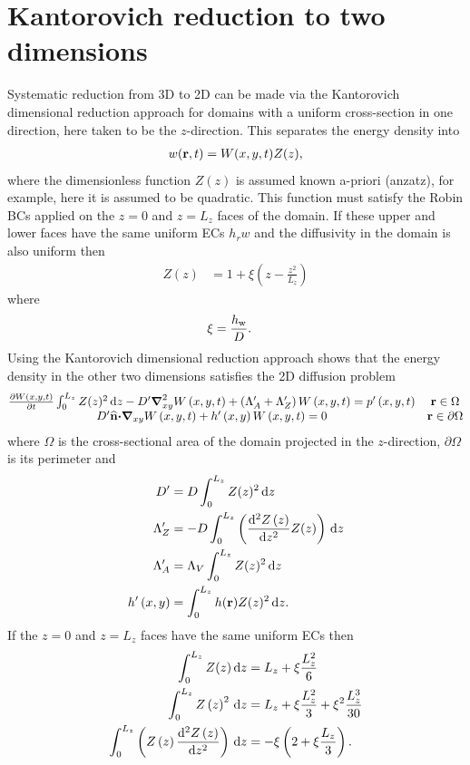 \documentclass[a4paper]{article}
\numberwithin{equation}{section}
\begin{document}
\section[Kantorovich reduction to two dimensions]{Kantorovich reduction to two dimensions}
\label{sc:Kant}

Systematic reduction from 3D to 2D can be made via the Kantorovich dimensional
reduction approach for domains with a uniform cross-section in one direction,
here taken to be the $z$-direction. This separates the energy density into
\begin{align}
w(\boldsymbol{\mathrm{r}},t) = W(x,y,t)Z(z),
\end{align}
where the dimensionless function $Z(z)$ is assumed known a-priori
(anzatz), for example, here it is assumed to be quadratic. This function must
satisfy the Robin BCs applied on the  $z=0$ and  $z=L_z$ faces of the domain.
If these upper and lower faces have the same uniform ECs $h_rw$ and the
diffusivity in the domain is also uniform then
\begin{align}
Z(z) &= 1 + \xi\left( z-\frac{z^2}{L_z} \right)
\end{align}
where
\begin{align}
\xi &= \frac{h_{\mathrm{w}}} D.
\end{align}
Using the Kantorovich dimensional reduction approach shows that the energy
density in the other two dimensions satisfies the 2D diffusion problem
\begin{align}
\begin{matrix}
\frac{{\partial}W\left(x,y,t\right)}{{\partial}t}
\int_0^{L_z}Z(z)^2\,\mathrm{d}{z}
- D^\prime{\boldsymbol{\mathrm{\nabla}}}_{xy}^2W\left(x,y,t\right)
+ \left(\Lambda_A^\prime+\Lambda _Z^\prime\right)W\left(x,y,t\right)
= p^\prime\left(x,y,t\right)
& \boldsymbol{\mathrm{r}}\in\Omega\\
D^\prime\widehat{\boldsymbol{\mathrm{n}}}{\boldsymbol{\mathrm{\cdot}}}{\boldsymbol{\mathrm{\nabla}}}_{xy}W\left(x,y,t\right)+h^\prime\left(x,y\right)W\left(x,y,t\right)=0
&\boldsymbol{\mathrm{r}}\in\partial\Omega
\end{matrix}
\end{align}
where $\Omega$ is the cross-sectional area of the domain projected in the
$z$-direction, $\partial\Omega$ is its perimeter and
\begin{align}
D^\prime &= D \int_0^{L_z} Z(z)^2\,\mathrm{d}{z} \\
\Lambda_Z^\prime &= -D \int_0^{L_z} \left(\frac{\mathrm{d}^2Z\left(z\right)}{\mathrm{d} z^2}Z(z)\right)\,\mathrm{d}{z} \\
\Lambda_A^\prime &= \Lambda_V \int_0^{L_z} Z(z)^2\,\mathrm{d}{z} \\
h^\prime\left(x,y\right) &= \int_0^{L_z} h(\boldsymbol{\mathrm{r}}) Z(z)^2\,\mathrm{d}{z}.
\end{align}
If the $z=0$ and $z=L_z$ faces have the same uniform ECs then
\begin{align}
\int_0^{L_z} Z(z)\,\mathrm{d}{z} &= L_z+\xi\frac{L_z^2}{6} \\
\int_0^{L_z} Z\left(z\right)^2\,\mathrm{d}{z} &= L_z+\xi\frac{L_z^2}{3}+\xi^2\frac{L_z^3}{30} \\
\int_0^{L_z} \left(Z\left(z\right)\frac{\mathrm{d}^2Z\left(z\right)}{\mathrm{d} z^2}\right)\,\mathrm{d}{z} &=-\xi\left(2+\xi \frac{L_z} 3\right).
\end{align}
\end{document}
